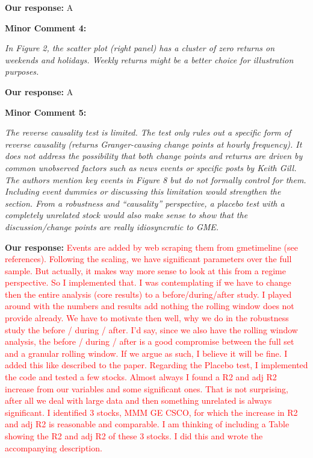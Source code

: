 \documentclass[11pt]{article}
\newcommand{\reviewercomment}[1]{\begin{commentbox}\textit{#1}\end{commentbox}}
\newcommand{\ourresponse}[1]{\textbf{Our response:} #1}
\begin{document}
\ourresponse{
	A
}

\bigskip

\textbf{Minor Comment 4:}

\reviewercomment{%
	In Figure 2, the scatter plot (right panel) has a cluster of zero returns on weekends and holidays. Weekly returns might be a better choice for illustration purposes. 
}

\ourresponse{
	A
}

\bigskip

\textbf{Minor Comment 5:}

\reviewercomment{%
	The reverse causality test is limited. The test only rules out a specific form of reverse causality (returns Granger-causing change points at hourly frequency). It does not address the possibility that both change points and returns are driven by common unobserved factors such as news events or specific posts by Keith Gill. The authors mention key events in Figure 8 but do not formally control for them. Including event dummies or discussing this limitation would strengthen the section. From a robustness and “causality” perspective, a placebo test with a completely unrelated stock would also make sense to show that the discussion/change points are really idiosyncratic to GME. 
}

\ourresponse{
	\textcolor{red}{Events are added by web scraping them from gmetimeline (see references). Following the scaling, we have significant parameters over the full sample. But actually, it makes way more sense to look at this from a regime perspective. So I implemented that.}
	\textcolor{red}{I was contemplating if we have to change then the entire analysis (core results) to a before/during/after study. I played around with the numbers and results add nothing the rolling window does not provide already. We have to motivate then well, why we do in the robustness study the before / during / after. I'd say, since we also have the rolling window analysis, the before / during / after is a good compromise between the full set and a granular rolling window. If we argue as such, I believe it will be fine. I added this like described to the paper.}
	\textcolor{red}{Regarding the Placebo test, I implemented the code and tested a few stocks. Almost always I found a R2 and adj R2 increase from our variables and some significant ones. That is not surprising, after all we deal with large data and then something unrelated is always significant. I identified 3 stocks, MMM GE CSCO, for which the increase in R2 and adj R2 is reasonable and comparable. I am thinking of including a Table showing the R2 and adj R2 of these 3 stocks. I did this and wrote the accompanying description. }
}
\end{document}
